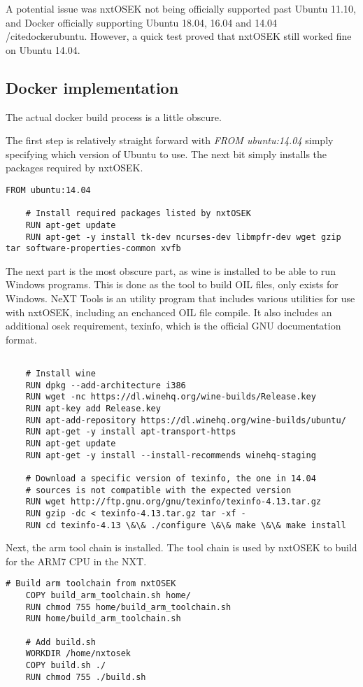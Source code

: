 A potential issue was nxtOSEK not being officially supported past Ubuntu 11.10, and Docker officially supporting Ubuntu 18.04, 16.04 and 14.04 /cite{dockerubuntu}.
However, a quick test proved that nxtOSEK still worked fine on Ubuntu 14.04.

\subsection{Docker implementation}\label{subsec:dockerimplementation}
The actual docker build process is a little obscure.

The first step is relatively straight forward with \textit{FROM ubuntu:14.04} simply specifying which version of Ubuntu to use.
The next bit simply installs the packages required by nxtOSEK.
\begin{lstlisting}[language=docker,label={lst:dockerimplementation1},caption={Version definition and installation of packages required by nxtOSEK}]
    FROM ubuntu:14.04

    # Install required packages listed by nxtOSEK
    RUN apt-get update
    RUN apt-get -y install tk-dev ncurses-dev libmpfr-dev wget gzip tar software-properties-common xvfb
\end{lstlisting} 

The next part is the most obscure part, as wine is installed to be able to run Windows programs.
This is done as the tool to build OIL files, only exists for Windows.
NeXT Tools is an utility program that includes various utilities for use with nxtOSEK, including an enchanced OIL file compile\cite{nxttool}.
It also includes an additional osek requirement, texinfo, which is the official GNU documentation format\cite{texinfo}.

\begin{lstlisting}[language=docker,label={lst:dockerimplementation2},caption={Reee}]

    # Install wine
    RUN dpkg --add-architecture i386
    RUN wget -nc https://dl.winehq.org/wine-builds/Release.key
    RUN apt-key add Release.key
    RUN apt-add-repository https://dl.winehq.org/wine-builds/ubuntu/
    RUN apt-get -y install apt-transport-https
    RUN apt-get update
    RUN apt-get -y install --install-recommends winehq-staging
    
    # Download a specific version of texinfo, the one in 14.04 
    # sources is not compatible with the expected version
    RUN wget http://ftp.gnu.org/gnu/texinfo/texinfo-4.13.tar.gz
    RUN gzip -dc < texinfo-4.13.tar.gz tar -xf -
    RUN cd texinfo-4.13 \&\& ./configure \&\& make \&\& make install
\end{lstlisting} 
Next, the arm tool chain is installed.
The tool chain is used by nxtOSEK to build for the ARM7 CPU in the NXT.
\begin{lstlisting}[language=docker,label={lst:dockerimplementation3},caption={Reee}]
    # Build arm toolchain from nxtOSEK
    COPY build_arm_toolchain.sh home/
    RUN chmod 755 home/build_arm_toolchain.sh
    RUN home/build_arm_toolchain.sh
    
    # Add build.sh
    WORKDIR /home/nxtosek
    COPY build.sh ./
    RUN chmod 755 ./build.sh
\end{lstlisting}

